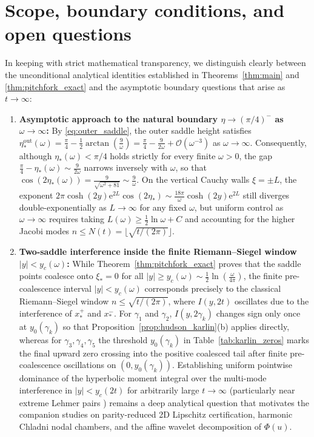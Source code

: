 \documentclass[11pt,a4paper,reqno]{amsart}
\theoremstyle{definition}
\theoremstyle{remark}
\numberwithin{equation}{section}
\newcommand{\ee}{\mathrm{e}}
\begin{document}
\section{Scope, boundary conditions, and open questions}\label{sec:scope}

In keeping with strict mathematical transparency, we distinguish clearly between the unconditional analytical identities established in Theorems~\ref{thm:main} and \ref{thm:pitchfork_exact} and the asymptotic boundary questions that arise as $t \to \infty$:

\begin{enumerate}
\item \textbf{Asymptotic approach to the natural boundary $\eta \to (\pi/4)^-$ as $\omega \to \infty$:}
By \eqref{eq:outer_saddle}, the outer saddle height satisfies $\eta_*^{\mathrm{out}}(\omega) = \frac{\pi}{4} - \frac{1}{2}\arctan(\frac{9}{\omega}) = \frac{\pi}{4} - \frac{9}{2\omega} + \mathcal{O}(\omega^{-3})$ as $\omega \to \infty$. Consequently, although $\eta_*(\omega) < \pi/4$ holds strictly for every finite $\omega > 0$, the gap $\frac{\pi}{4} - \eta_*(\omega) \sim \frac{9}{2\omega}$ narrows inversely with $\omega$, so that $\cos(2\eta_*(\omega)) = \frac{9}{\sqrt{\omega^2+81}} \sim \frac{9}{\omega}$. On the vertical Cauchy walls $\xi = \pm L$, the exponent $2\pi\cosh(2y)\ee^{2L}\cos(2\eta_*) \sim \frac{18\pi}{\omega}\cosh(2y)\ee^{2L}$ still diverges double-exponentially as $L \to \infty$ for any fixed $\omega$, but uniform control as $\omega \to \infty$ requires taking $L(\omega) \ge \frac{1}{2}\ln\omega + C$ and accounting for the higher Jacobi modes $n \le N(t) = \lfloor\sqrt{t/(2\pi)}\rfloor$.
\item \textbf{Two-saddle interference inside the finite Riemann--Siegel window $|y| < y_c(\omega)$:}
While Theorem~\ref{thm:pitchfork_exact} proves that the saddle points coalesce onto $\xi_* = 0$ for all $|y| \ge y_c(\omega) \sim \frac{1}{2}\ln(\frac{\omega}{4\pi})$, the finite pre-coalescence interval $|y| < y_c(\omega)$ corresponds precisely to the classical Riemann--Siegel window $n \le \sqrt{t/(2\pi)}$, where $I(y,2t)$ oscillates due to the interference of $x_*^+$ and $x_*^-$. For $\gamma_1$ and $\gamma_2$, $I(y,2\gamma_k)$ changes sign only once at $y_0(\gamma_k)$ so that Proposition~\ref{prop:hudson_karlin}(b) applies directly, whereas for $\gamma_3, \gamma_4, \gamma_5$ the threshold $y_0(\gamma_k)$ in Table~\ref{tab:karlin_zeros} marks the final upward zero crossing into the positive coalesced tail after finite pre-coalescence oscillations on $(0, y_0(\gamma_k))$. Establishing uniform pointwise dominance of the hyperbolic moment integral over the multi-mode interference in $|y| < y_c(2t)$ for arbitrarily large $t \to \infty$ (particularly near extreme Lehmer pairs \cite{Lehmer1956,Griffin2019}) remains a deep analytical question that motivates the companion studies on parity-reduced 2D Lipschitz certification, harmonic Chladni nodal chambers, and the affine wavelet decomposition of $\Phi(u)$.
\end{enumerate}
\end{document}

